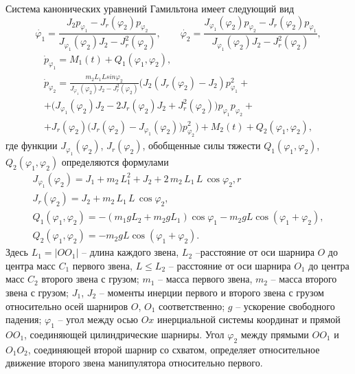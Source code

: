 Система канонических уравнений Гамильтона имеет следующий вид
$$
\dot{\varphi_1}=\frac{J_2 p_{\varphi_1}-J_r(\varphi_2)p_{\varphi_2}}{J_{\varphi_1}(\varphi_2)J_2-J_r^2(\varphi_2)}, \qquad
		\dot{\varphi_2}=\frac{J_{\varphi_1}(\varphi_2)p_{\varphi_2}-J_r(\varphi_2)p_{\varphi_1}}{J_{\varphi_1}(\varphi_2)J_2-J_r^2(\varphi_2)}, 
$$
\begin{equation}
	\begin{gathered}
				\dot{p}_{\varphi_1}=M_1 (t) + Q_1 (\varphi_1, \varphi_2), \\
		\dot{p}_{\varphi_2}=\frac{m_2L_1Lsin\varphi_2 }{J_{\varphi_1}(\varphi_2)J_2-J_r^2(\varphi_2)}
		\Big( J_2(J_r(\varphi_2)-J_2)p_{\varphi_1}^2 +\\+\bigl(J_{\varphi_1}(\varphi_2)J_2-2J_r(\varphi_2)J_2+J_r^2(\varphi_2)\bigr)p_{\varphi_1}p_{\varphi_2}+\\+J_r(\varphi_2)\bigl(J_r(\varphi_2)-J_{\varphi_1}(\varphi_2)  \bigr)p_{\varphi_2}^2\Big)+M_2(t)  + Q_2 (\varphi_1, \varphi_2),
	\end{gathered}
	\label{sys}
\end{equation}
где функции $J_{\varphi_1}(\varphi_2)$, $J_{r}(\varphi_2)$, обобщенные силы тяжести $Q_1 (\varphi_1, \varphi_2)$, $ Q_2 (\varphi_1, \varphi_2)$ определяются формулами
\begin{equation*}
	\begin{gathered}
		J_{\varphi_1}(\varphi_2)=J_1 + m_2\,L_1^2 + J_2+2\,m_2\,L_1\,L\, \cos \varphi_2 ,r\\
		J_{r}(\varphi_2)=J_2+m_2\,L_1\,L\,\cos\varphi_2 , \\
		Q_1 (\varphi_1, \varphi_2)=- \left( m_1gL_2+m_2gL_1\right) \cos{\varphi_1}-m_2gL \cos{\left( \varphi_1+\varphi_2\right)},\\
		Q_2 (\varphi_1, \varphi_2)=-m_2gL \cos{\left( \varphi_1+\varphi_2\right)}.
	\end{gathered}
\end{equation*}
Здесь $L_1=|OO_1|$ -- длина каждого звена, $L_2$ --расстояние от оси шарнира $O$ до центра масс $C_1$ первого звена, $L \leq L_2$ -- расстояние от оси шарнира $O_1$ до центра масс $C_2$ второго звена с грузом; $m_1$ -- масса первого звена, $m_2$ -- масса второго звена с грузом; $J_1$, $J_2$ -- моменты инерции первого и второго звена с грузом относительно осей шарниров $O$, $O_1$ соответственно; $g$ -- ускорение свободного падения; $\varphi_1$ -- угол между осью $Ox$ инерциальной системы координат и прямой $OO_1$, соединяющей цилиндрические шарниры. Угол $\varphi_2$  между прямыми $OO_1$ и $O_1O_2$, соединяющей второй шарнир со схватом, определяет относительное движение второго звена манипулятора относительно первого.

